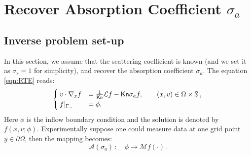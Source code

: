 \documentclass[english,reqno]{amsart}
\theoremstyle{plain}
\theoremstyle{definition} %
\newcommand{\Kn}{\mathsf{Kn}}
\begin{document}
\section{Recover Absorption Coefficient $\sigma_a$}

\subsection{Inverse problem set-up}
In this section, we assume that the scattering coefficient is known (and we set it as $\sigma_s = 1$ for simplicity), and recover the absorption coefficient $\sigma_a$. The equation \eqref{eqn:RTE} reads:
\begin{equation}\label{eqn:RTE_abs}
\begin{cases}
v \cdot \nabla_x f&=\frac{1}{\Kn}\mathcal{L}f-\Kn\sigma_af, \qquad (x, v) \in \Omega \times \mathbb{S}\,,  \\
f|_{\Gamma_-}&=\phi. \hspace{2.7cm}  %
\end{cases}\,
\end{equation}
Here $\phi$ is the inflow boundary condition and the solution is denoted by $f(x,v;\phi)$. Experimentally suppose one could measure data at one grid point $y\in\partial\Omega$, then the mapping becomes:
\begin{equation*}
\mathcal{A}(\sigma_a)\,:\quad \phi \to \mathcal{M}f(\cdot)\,.
\end{equation*}
\end{document}
